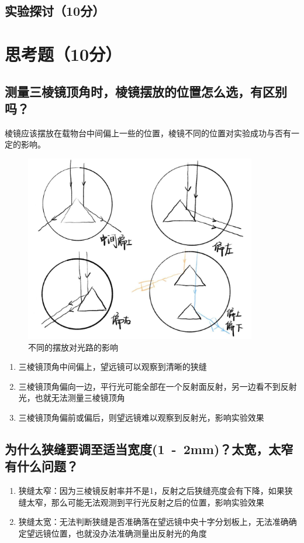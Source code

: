 \documentclass{../template/Report}%
\begin{document}
\subsection{实验探讨（10分）}
\section{思考题（10分）}
\subsection{测量三棱镜顶角时，棱镜摆放的位置怎么选，有区别吗？}
棱镜应该摆放在载物台中间偏上一些的位置，棱镜不同的位置对实验成功与否有一定的影响。
\begin{figure}[H]
\centering
\includegraphics[width=0.9\textwidth]{./figures/思考1.jpg}
\caption{不同的摆放对光路的影响}
\end{figure}
\begin{enumerate}
  \item 三棱镜顶角中间偏上，望远镜可以观察到清晰的狭缝
  \item 三棱镜顶角偏向一边，平行光可能全部在一个反射面反射，另一边看不到反射光，也就无法测量三棱镜顶角
  \item 三棱镜顶角偏前或偏后，则望远镜难以观察到反射光，影响实验效果
\end{enumerate}
\subsection{为什么狭缝要调至适当宽度(\si{1-2}{mm})？太宽，太窄有什么问题？}
\begin{enumerate}
  \item 狭缝太窄：因为三棱镜反射率并不是1，反射之后狭缝亮度会有下降，如果狭缝太窄，那么可能无法观测到平行光反射之后的位置，影响实验效果
  \item 狭缝太宽：无法判断狭缝是否准确落在望远镜中央十字分划板上，无法准确确定望远镜位置，也就没办法准确测量出反射光的角度
\end{enumerate}
\end{document}

